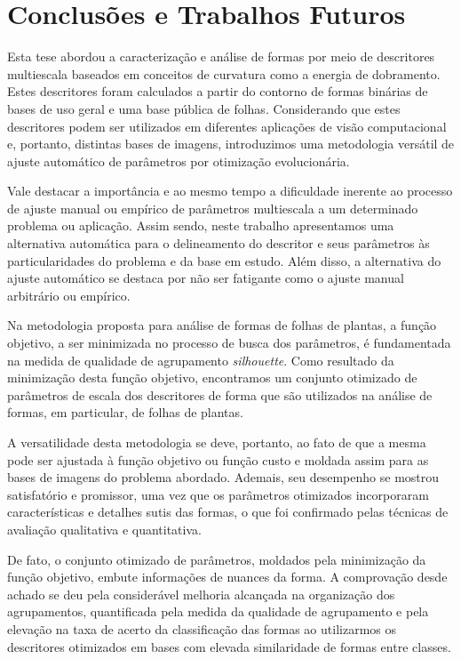 \chapter{Conclusões e Trabalhos Futuros \label{chap:ch5}}

Esta tese abordou a caracterização e análise de formas por meio de descritores multiescala baseados em conceitos de curvatura como a energia de dobramento. Estes descritores foram calculados a partir do contorno de formas binárias de bases de uso geral e uma base pública de folhas. Considerando que estes descritores podem ser utilizados em diferentes aplicações de visão computacional e,  portanto, distintas bases de imagens, introduzimos uma metodologia versátil de ajuste automático de parâmetros por otimização evolucionária. 

Vale destacar a importância e ao mesmo tempo a dificuldade inerente ao processo de ajuste manual ou empírico de parâmetros multiescala a um determinado problema ou aplicação. Assim sendo, neste trabalho apresentamos uma alternativa automática para o delineamento do descritor e seus parâmetros às particularidades do problema e da base em estudo.  
Além disso, a alternativa do ajuste automático se destaca por não ser fatigante como o ajuste manual arbitrário ou empírico.

Na metodologia proposta para análise de formas de folhas de plantas, a função objetivo, a ser minimizada no processo de busca dos parâmetros, é fundamentada na medida de qualidade de agrupamento \textit{silhouette}. Como resultado da minimização desta função objetivo, encontramos um conjunto otimizado de parâmetros de escala dos descritores de forma que são utilizados na análise de formas, em particular, de folhas de plantas.  

A versatilidade desta metodologia se deve, portanto, ao fato de que a mesma pode ser ajustada à função  objetivo ou função custo e moldada assim para as bases de imagens do problema abordado. Ademais, seu desempenho se mostrou satisfatório e promissor, uma vez que os parâmetros otimizados incorporaram características e detalhes sutis das formas, o que foi confirmado pelas técnicas de avaliação qualitativa e quantitativa. 

De fato, o conjunto otimizado de parâmetros, moldados pela minimização da função objetivo,  embute informações de nuances da forma. A comprovação desde achado se deu pela considerável melhoria alcançada na organização dos agrupamentos, quantificada pela medida da qualidade de agrupamento e pela elevação na taxa de acerto da classificação das formas ao utilizarmos os descritores otimizados em bases com elevada similaridade de formas entre classes. 

